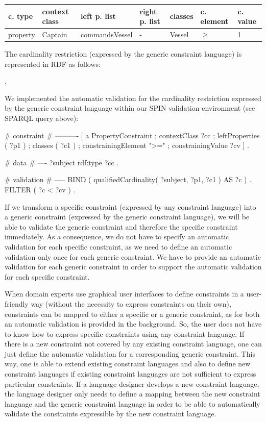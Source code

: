 \documentclass{llncs}
\newenvironment{gcotable}{
  \scriptsize
  \sffamily
  \vspace{0.3cm}
	\begin{center}
  \begin{tabular}{l|l|l|l|l|l|l}
  \hline
  \textbf{c. type} & \textbf{context class} & \textbf{left p. list} & \textbf{right p. list} & \textbf{classes} & \textbf{c. element} & \textbf{c. value} \\
  \hline

}{
  \hline
  \end{tabular}
	\end{center}
}
\begin{document}
\begin{gcotable}
property & Captain & commandsVessel & - & Vessel & $\geq$ & 1 \\
\end{gcotable}

The cardinality restriction (expressed by the generic constraint language) is represented in RDF as follows:

\begin{ex}
[   a PropertyConstraint ;
    contextClass StarFleetCaptain ;
    leftProperties ( commandsVessel ) ;
    classes ( Vessel ) ;
    constrainingElement ">=" ;
    constrainingValue "1" ] .
\end{ex}

We implemented the automatic validation for the cardinality restriction expressed by the generic constraint language within our SPIN validation environment (see SPARQL query above):

\begin{ex}
# constraint
# ----------
[   a PropertyConstraint ;
    contextClass ?cc ;
    leftProperties ( ?p1 ) ;
    classes ( ?c1 ) ;
    constrainingElement ">=" ;
    constrainingValue ?cv ] .
		
# data
# ----
?subject rdf:type ?cc .

# validation
# -----
BIND ( qualifiedCardinality( ?subject, ?p1, ?c1 ) AS ?c ) .
FILTER ( ?c < ?cv ) .		  
\end{ex}

If we transform a specific constraint (expressed by any constraint language) into a generic constraint (expressed by the generic constraint language), we will be able to validate the generic constraint and therefore the specific constraint immediately. 
As a consequence, we do not have to specify an automatic validation for each specific constraint, as we need to define an automatic validation only once for each generic constraint. 
We have to provide an automatic validation for each generic constraint in order to support the automatic validation for each specific constraint.

When domain experts use graphical user interfaces to define constraints in a user-friendly way (without the necessity to express constraints on their own), 
constraints can be mapped to either a specific or a generic constraint, as for both an automatic validation is provided in the background.    
So, the user does not have to know how to express specific constraints using any constraint language.
If there is a new constraint not covered by any existing constraint language, one can just define the automatic validation for a corresponding generic constraint.
This way, one is able to extend existing constraint languages and also to define new constraint languages if existing constraint languages are not sufficient to express particular constraints.
If a language designer develops a new constraint language, 
the language designer only needs to define a mapping between the new constraint language and the generic constraint language
in order to be able to automatically validate the constraints expressible by the new constraint language.
\end{document}
